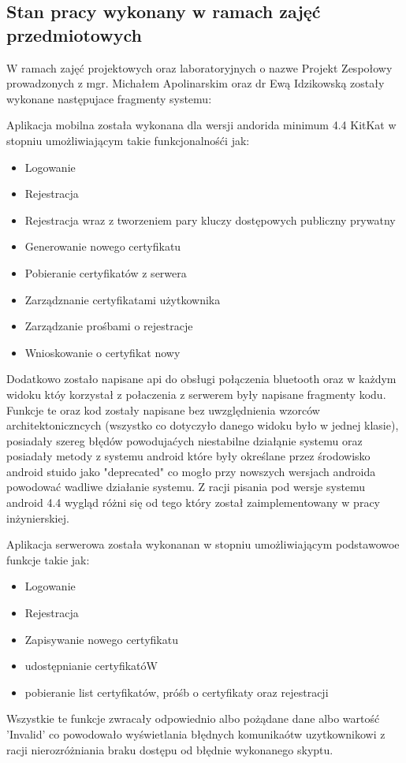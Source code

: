 \newpage
\subsection{Stan pracy wykonany w ramach zajęć \newline przedmiotowych} 
W ramach zajęć projektowych oraz laboratoryjnych o nazwe Projekt Zespołowy prowadzonych z mgr. Michałem Apolinarskim oraz dr Ewą Idzikowską zostały wykonane następujace fragmenty systemu:
	
	Aplikacja mobilna została wykonana dla wersji andorida minimum 4.4 KitKat w stopniu umożliwiającym takie funkcjonalnośći jak:
	\begin{itemize}
		\item Logowanie
		\item Rejestracja
		\item Rejestracja wraz z tworzeniem pary kluczy dostępowych publiczny prywatny
		\item Generowanie nowego certyfikatu
		\item Pobieranie certyfikatów z serwera
		\item Zarządznanie certyfikatami użytkownika
		\item Zarządzanie prośbami o rejestracje
		\item Wnioskowanie o certyfikat nowy
	\end{itemize}
		Dodatkowo zostało napisane api do obsługi połączenia bluetooth oraz w każdym widoku któy korzystał z połaczenia z serwerem były napisane fragmenty kodu. Funkcje te oraz kod zostały napisane bez uwzględnienia wzorców architektoniczncych (wszystko co dotyczyło danego widoku było w jednej klasie), posiadały szereg błędów powodujaćych niestabilne działąnie systemu oraz posiadały metody z systemu android które były określane przez środowisko android stuido jako "deprecated" co mogło przy nowszych wersjach androida powodować wadliwe działanie systemu. Z racji pisania pod wersje systemu android 4.4 wygląd różni się od tego który został zaimplementowany w pracy inżynierskiej.
		 
	
	
   Aplikacja serwerowa została wykonanan w stopniu umożliwiającym podstawowoe funkcje takie jak:
   		\begin{itemize}
   		\item Logowanie
   		\item Rejestracja
   		\item Zapisywanie nowego certyfikatu
   		\item udostępnianie certyfikatóW
   		\item pobieranie list certyfikatów, próśb o certyfikaty oraz rejestracji
   	\end{itemize}
	Wszystkie te funkcje zwracały odpowiednio albo pożądane dane albo wartość 'Invalid' co powodowało wyświetlania błędnych komunikaótw uzytkownikowi z racji nierozróżniania braku dostępu od błędnie wykonanego skyptu.
	
